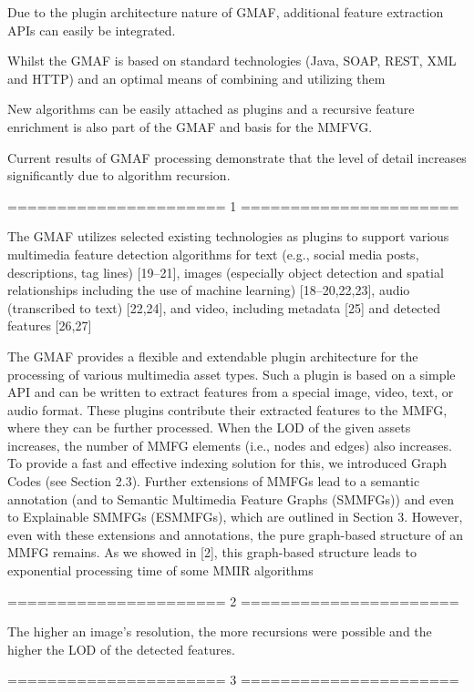 Due to the plugin architecture nature of GMAF, additional feature extraction APIs can easily be integrated.

Whilst the GMAF is based on standard technologies (Java, SOAP, REST, XML and HTTP) and an optimal means of combining and utilizing them

New algorithms can be easily attached as plugins and a recursive feature enrichment is also part of the GMAF and basis for the MMFVG.

Current results of GMAF processing demonstrate that the level of detail increases significantly due to algorithm recursion.

====================== 1
======================

The GMAF utilizes selected existing technologies as plugins to support various
multimedia feature detection algorithms for text (e.g., social media posts, descriptions, tag
lines) [19–21], images (especially object detection and spatial relationships including the use of
machine learning) [18–20,22,23], audio (transcribed to text) [22,24], and video, including
metadata [25] and detected features [26,27]

The GMAF provides a flexible and extendable plugin architecture for the processing of
various multimedia asset types. Such a plugin is based on a simple API and can be written to
extract features from a special image, video, text, or audio format. These plugins contribute
their extracted features to the MMFG, where they can be further processed. When the LOD
of the given assets increases, the number of MMFG elements (i.e., nodes and edges) also
increases. To provide a fast and effective indexing solution for this, we introduced Graph
Codes (see Section 2.3). Further extensions of MMFGs lead to a semantic annotation (and
to Semantic Multimedia Feature Graphs (SMMFGs)) and even to Explainable SMMFGs
(ESMMFGs), which are outlined in Section 3. However, even with these extensions and
annotations, the pure graph-based structure of an MMFG remains. As we showed in [2],
this graph-based structure leads to exponential processing time of some MMIR algorithms

====================== 2
======================

The higher an image’s resolution, the more recursions were possible and the higher the LOD of the detected features.

====================== 3
======================

